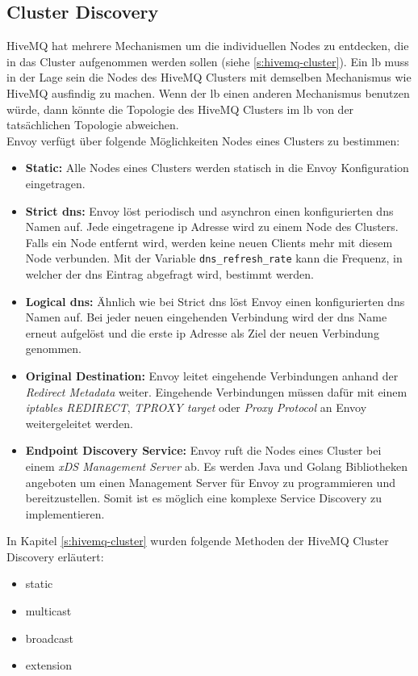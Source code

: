 \subsection{Cluster Discovery} \label{ss:cluster-discovery}
HiveMQ hat mehrere Mechanismen um die individuellen Nodes zu entdecken, die in das Cluster aufgenommen werden sollen (siehe \ref{s:hivemq-cluster}).
Ein \acl{lb} muss in der Lage sein die Nodes des HiveMQ Clusters mit demselben Mechanismus wie HiveMQ ausfindig zu machen. Wenn der \ac{lb} einen anderen Mechanismus benutzen würde, dann könnte die Topologie des HiveMQ Clusters im \ac{lb} von der tatsächlichen Topologie abweichen.\\
Envoy verfügt über folgende Möglichkeiten Nodes eines Clusters zu bestimmen:
\begin{itemize}
  \item \textbf{Static:} Alle Nodes eines Clusters werden statisch in die Envoy Konfiguration eingetragen.
  \item \textbf{Strict \ac{dns}:} Envoy löst periodisch und asynchron einen konfigurierten \ac{dns} Namen auf. Jede eingetragene \ac{ip} Adresse wird zu einem Node des Clusters. Falls ein Node entfernt wird, werden keine neuen Clients mehr mit diesem Node verbunden. Mit der Variable \verb|dns_refresh_rate| kann die Frequenz, in welcher der \ac{dns} Eintrag abgefragt wird, bestimmt werden.
  \item \textbf{Logical \ac{dns}:} Ähnlich wie bei Strict \ac{dns} löst Envoy einen konfigurierten \ac{dns} Namen auf. Bei jeder neuen eingehenden Verbindung wird der \ac{dns} Name erneut aufgelöst und die erste \ac{ip} Adresse als Ziel der neuen Verbindung genommen.
  \item \textbf{Original Destination:} Envoy leitet eingehende Verbindungen anhand der \textit{Redirect Metadata} weiter. Eingehende Verbindungen müssen dafür mit einem \textit{iptables REDIRECT}, \textit{TPROXY target} oder \textit{Proxy Protocol} an Envoy weitergeleitet werden.
  \item \textbf{Endpoint Discovery Service:} Envoy ruft die Nodes eines Cluster bei einem \textit{xDS Management Server} ab. Es werden Java und Golang Bibliotheken angeboten um einen Management Server für Envoy zu programmieren und bereitzustellen. Somit ist es möglich eine komplexe Service Discovery zu implementieren.
\end{itemize}
\cite{ServiceDiscoveryEnvoy}
In Kapitel \ref{s:hivemq-cluster} wurden folgende Methoden der HiveMQ Cluster Discovery erläutert:
\begin{itemize}
  \item static
  \item multicast
  \item broadcast
  \item extension
\end{itemize}
